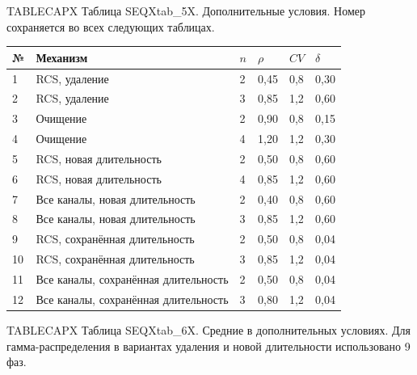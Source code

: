 \noindent TABLECAPX Таблица SEQXtab_5X. Дополнительные условия. Номер сохраняется во всех следующих таблицах.\par

\setlength{\tabcolsep}{2pt}
\begin{tabular}{p{0.76cm}p{7.65cm}p{1.04cm}p{1.89cm}p{1.89cm}p{1.89cm}}
\toprule
№ & Механизм & $n$ & $\rho$ & $CV$ & $\delta$ \\
\midrule
1 & RCS, удаление & 2 & 0,45 & 0,8 & 0,30 \\
2 & RCS, удаление & 3 & 0,85 & 1,2 & 0,60 \\
3 & Очищение & 2 & 0,90 & 0,8 & 0,15 \\
4 & Очищение & 4 & 1,20 & 1,2 & 0,30 \\
5 & RCS, новая длительность & 2 & 0,50 & 0,8 & 0,60 \\
6 & RCS, новая длительность & 4 & 0,85 & 1,2 & 0,60 \\
7 & Все каналы, новая длительность & 2 & 0,40 & 0,8 & 0,60 \\
8 & Все каналы, новая длительность & 3 & 0,85 & 1,2 & 0,60 \\
9 & RCS, сохранённая длительность & 2 & 0,50 & 0,8 & 0,04 \\
10 & RCS, сохранённая длительность & 3 & 0,85 & 1,2 & 0,04 \\
11 & Все каналы, сохранённая длительность & 2 & 0,50 & 0,8 & 0,04 \\
12 & Все каналы, сохранённая длительность & 3 & 0,80 & 1,2 & 0,04 \\
\bottomrule
\end{tabular}




\noindent TABLECAPX Таблица SEQXtab_6X. Средние в дополнительных условиях. Для гамма-распределения в вариантах удаления и новой длительности использовано 9 фаз.\par

